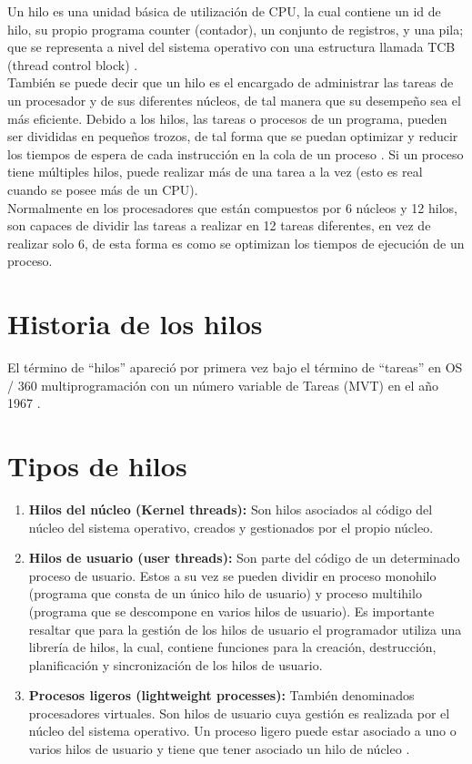 \documentclass[11pt,letterpaper]{article}
\begin{document}
Un hilo es una unidad básica de utilización de CPU, la cual contiene un id de hilo, su propio programa counter (contador), un conjunto de registros, y una pila; que se representa a nivel del sistema operativo con una estructura llamada TCB (thread control block) \cite{1:Online}.\\
También se puede decir que un hilo es el encargado de administrar las tareas de un procesador y de sus diferentes núcleos, de tal manera que su desempeño sea el más eficiente. Debido a los hilos, las tareas o procesos de un programa, pueden ser divididas en pequeños trozos, de tal forma que se puedan optimizar y reducir los tiempos de espera de cada instrucción en la cola de un proceso \cite{2:Online}. Si un proceso tiene múltiples hilos, puede realizar más de una tarea a la vez (esto es real cuando se posee más de un CPU).\\
Normalmente en los procesadores que están compuestos por 6 núcleos y 12 hilos, son capaces de dividir las tareas a realizar en 12 tareas diferentes, en vez de realizar solo 6, de esta forma es como se optimizan los tiempos de ejecución de un proceso.


\section*{Historia de los hilos}
El término de “hilos” apareció por primera vez bajo el término de “tareas” en OS / 360 multiprogramación con un número variable de Tareas (MVT) en el año 1967 \cite{3:Online}.

\section*{Tipos de hilos}
\begin{enumerate}
\item \textbf{Hilos del núcleo (Kernel threads):} Son hilos asociados al código del núcleo del sistema operativo, creados y gestionados por el propio núcleo.
\item \textbf{Hilos de usuario (user threads):} Son parte del código de un determinado proceso de usuario. Estos a su vez se pueden dividir en proceso monohilo (programa que consta de un único hilo de usuario) y proceso multihilo (programa que se descompone en varios hilos de usuario). Es importante resaltar que para la gestión de los hilos de usuario el programador utiliza una librería de hilos, la cual, contiene funciones para la creación, destrucción, planificación y sincronización de los hilos de usuario.
\item \textbf{Procesos ligeros (lightweight processes):} También denominados procesadores virtuales. Son hilos de usuario cuya gestión es realizada por el núcleo del sistema operativo. Un proceso ligero puede estar asociado a uno o varios hilos de usuario y tiene que tener asociado un hilo de núcleo \cite{4:Online}.
\end{enumerate}
\end{document}
